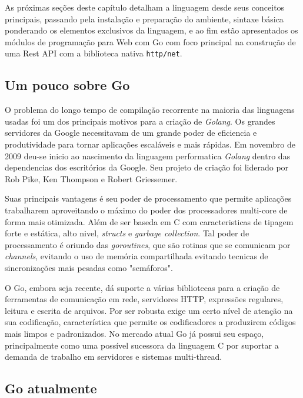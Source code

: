 \documentclass{SBCbookchapter}
\begin{document}
As próximas seções deste capítulo detalham a linguagem desde seus conceitos principais, passando pela instalação e preparação do ambiente, sintaxe básica ponderando os elementos exclusivos da linguagem, e ao fim estão apresentados os módulos de programação para Web com Go com foco principal na construção de uma Rest API com a biblioteca nativa \texttt{http/net}.

\subsection{Um pouco sobre Go}

O problema do longo tempo de compilação recorrente na maioria das linguagens usadas foi um dos principais motivos para a criação de \textit{Golang}. Os grandes servidores da Google necessitavam de um grande poder de eficiencia e produtividade para tornar aplicações escaláveis e mais rápidas. Em novembro de 2009 deu-se inicio ao nascimento da linguagem performatica \textit{Golang} dentro das dependencias dos escritórios da Google. Seu projeto de criação foi liderado por Rob Pike, Ken Thompson e Robert Griessemer.

Suas principais vantagens é seu poder de processamento que permite aplicações trabalharem aproveitando o máximo do poder dos processadores multi-core de forma mais otimizada. Além de ser baseda em C com caracteristicas de tipagem forte e estática, alto nivel, \textit{structs} e \textit{garbage collection}. Tal poder de processamento é oriundo das \textit{goroutines}, que são rotinas que se comunicam por \textit{channels}, evitando o uso de memória compartilhada evitando tecnicas de sincronizações mais pesadas como "semáforos".


O Go, embora seja recente, dá suporte a várias bibliotecas para a criação de ferramentas de comunicação em rede, servidores HTTP, expressões regulares, leitura e escrita de arquivos. Por ser robusta exige um certo nível de atenção na sua codificação, característica que permite os codificadores a produzirem códigos mais limpos e padronizados. No mercado atual Go já possui seu espaço, principalmente como uma possível sucessora da linguagem C por suportar a demanda de trabalho em servidores e sistemas multi-thread. %

\subsection{Go atualmente}
\end{document}
